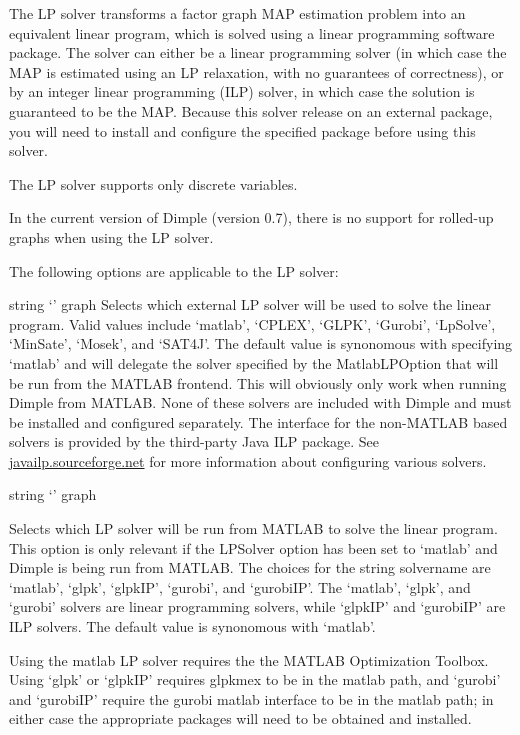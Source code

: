 The LP solver transforms a factor graph MAP estimation problem into an equivalent linear program, which is solved using a linear programming software package. The solver can either be a linear programming solver (in which case the MAP is estimated using an LP relaxation, with no guarantees of correctness), or by an integer linear programming (ILP) solver, in which case the solution is guaranteed to be the MAP. Because this solver release on an external package, you will need to install and configure the specified package before using this solver.

The LP solver supports only discrete variables.

In the current version of Dimple (version 0.7), there is no support for rolled-up graphs when using the LP solver.

The following options are applicable to the LP solver:



{string}
{`'}
{graph}
{Selects which external LP solver will be used to solve the linear program. Valid values include `matlab', `CPLEX', `GLPK', `Gurobi', `LpSolve', `MinSate', `Mosek', and `SAT4J'. The default value is synonomous with specifying `matlab' and will delegate the solver specified by the MatlabLPOption that will be run from the MATLAB frontend. This will obviously only work when running Dimple from MATLAB. None of these solvers are included with Dimple and must be installed and configured separately. The interface for the non-MATLAB based solvers is provided by the third-party Java ILP package. See \href{http://javailp.sourceforge.net}{javailp.sourceforge.net} for more information about configuring various solvers.}


{string}
{`'}
{graph}
{Selects which LP solver will be run from MATLAB to solve the linear program. This option is only relevant if the LPSolver option has been set to `matlab' and Dimple is being run from MATLAB. The choices for the string solvername are `matlab', `glpk', `glpkIP', `gurobi', and `gurobiIP'. The `matlab', `glpk', and `gurobi' solvers are linear programming solvers, while `glpkIP' and `gurobiIP' are ILP solvers. The default value is synonomous with `matlab'.

Using the matlab LP solver requires the the MATLAB Optimization Toolbox. Using `glpk' or `glpkIP' requires glpkmex to be in the matlab path, and `gurobi' and `gurobiIP' require the gurobi matlab interface to be in the matlab path; in either case the appropriate packages will need to be obtained and installed.
}

